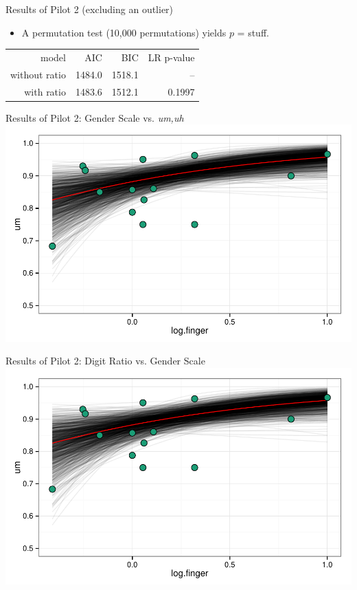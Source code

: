 \documentclass[hyperref={pdfpagelabels=false}]{beamer}
\begin{document}
\begin{frame}{Results of Pilot 2 (excluding an outlier)}
\begin{itemize}
\item A permutation test (10,000 permutations) yields $p$ = stuff.
\end{itemize}
\begin{center}
\begin{tabular}{rrrr}
\toprule
	model & AIC & BIC & LR p-value\\
	\cmidrule{2-4}
without ratio & 1484.0 & 1518.1 & -- \\
with ratio &  1483.6 & 1512.1 & 0.1997\\
\bottomrule
\end{tabular}
\end{center}

\end{frame}

\begin{frame}{Results of Pilot 2: Gender Scale vs. \textsl{um,uh}}
\includegraphics[width=1.12\textwidth]{figures/fingereffect.pdf}
\end{frame}

\begin{frame}{Results of Pilot 2: Digit Ratio vs. Gender Scale}
\includegraphics[width=1.12\textwidth]{figures/fingereffect.pdf}
\end{frame}
\end{document}
